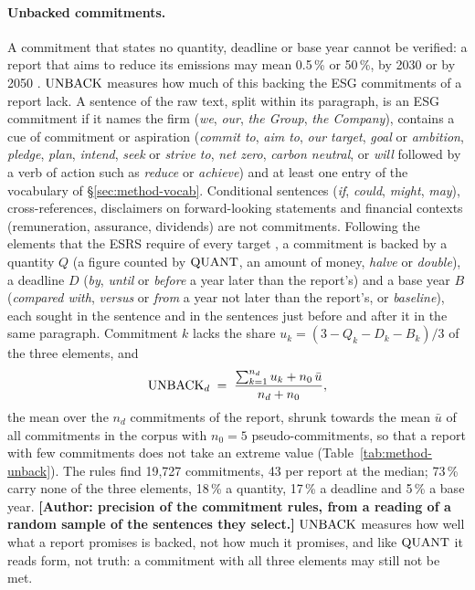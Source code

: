 \paragraph{Unbacked commitments.} A commitment that states no quantity,
deadline or base year cannot be verified: a report that aims to reduce its
emissions may mean 0.5\,\% or 50\,\%, by 2030 or by 2050
\citep{bingler2024}. $\mathrm{UNBACK}$ measures how much of this backing the ESG
commitments of a report lack. A sentence of the raw text, split within its
paragraph, is an ESG commitment if it names the firm (\emph{we}, \emph{our},
\emph{the Group}, \emph{the Company}), contains a cue of commitment or
aspiration (\emph{commit to}, \emph{aim to}, \emph{our target}, \emph{goal} or
\emph{ambition}, \emph{pledge}, \emph{plan}, \emph{intend}, \emph{seek} or
\emph{strive to}, \emph{net zero}, \emph{carbon neutral}, or \emph{will}
followed by a verb of action such as \emph{reduce} or \emph{achieve}) and at
least one entry of the vocabulary of \S\ref{sec:method-vocab}. Conditional
sentences (\emph{if}, \emph{could}, \emph{might}, \emph{may}), cross-references,
disclaimers on forward-looking statements and financial contexts
(remuneration, assurance, dividends) are not commitments. Following the
elements that the ESRS require of every target \citep{esrs2023}, a commitment
is backed by a quantity $Q$ (a figure counted by $\mathrm{QUANT}$, an amount of money,
\emph{halve} or \emph{double}), a deadline $D$ (\emph{by}, \emph{until} or
\emph{before} a year later than the report's) and a base year $B$
(\emph{compared with}, \emph{versus} or \emph{from} a year not later than the
report's, or \emph{baseline}), each sought in the sentence and in the sentences
just before and after it in the same paragraph. Commitment $k$ lacks the share
$u_k = (3 - Q_k - D_k - B_k)/3$ of the three elements, and
\[
\mathrm{UNBACK}_d \;=\; \frac{\sum_{k=1}^{n_d} u_k + n_0\,\bar u}{n_d + n_0},
\]
the mean over the $n_d$ commitments of the report, shrunk towards the mean
$\bar u$ of all commitments in the corpus with $n_0 = 5$ pseudo-commitments,
so that a report with few commitments does not take an extreme value
(Table~\ref{tab:method-unback}). The rules find 19,727 commitments, 43 per
report at the median; 73\,\% carry none of the three elements, 18\,\% a
quantity, 17\,\% a deadline and 5\,\% a base year.
\textbf{[Author: precision of the commitment rules, from a reading of a random
sample of the sentences they select.]} $\mathrm{UNBACK}$ measures how well what a
report promises is backed, not how much it promises, and like $\mathrm{QUANT}$ it reads
form, not truth: a commitment with all three elements may still not be met.

